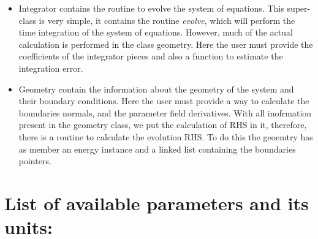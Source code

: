 \documentclass[final,5p,times,twocolumn]{elsarticle}
\begin{document}
\begin{itemize}
\item Integrator contains the routine to evolve the system of
  equations. This super-class is very simple, it contains the routine
  \textit{evolve}, which will perform the time integration of the
  system of equations. However, much of the actual calculation is
  performed in the class geometry. Here the user must provide the
  coefficients of the integrator pieces and also a function to
  estimate the integration error.

\item Geometry contain the information about the geometry of the
  system and their boundary conditions. Here the user must provide a
  way to calculate the boundaries normals, and the parameter field
  derivatives. With all inofrmation present in the geometry class, we
  put the calculation of RHS in it, therefore, there is a routine to
  calculate the evolution RHS. To do this the geoemtry has as member
  an energy instance and a linked list containing the boundaries
  pointers.


\end{itemize}

 
\section{List of available parameters and its units:}
 \label{apx:list_of_parameters}
\end{document}
